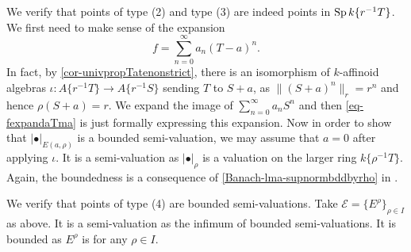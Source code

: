 \begin{example}
    We verify that points of type (2) and type (3) are indeed points in $\operatorname{Sp} k\{r^{-1}T\}$. We first need to make sense of the expansion 
    \begin{equation}\label{eq-fexpandaTma}
        f=\sum_{n=0}^{\infty}a_n (T-a)^n.
    \end{equation}
    In fact, by \cref{cor-univpropTatenonstrict}, there is an isomorphism of $k$-affinoid algebras $\iota:A\{r^{-1}T\}\rightarrow A\{r^{-1}S\}$ sending $T$ to $S+a$, as $\|(S+a)^n\|_r=r^n$ and hence $\rho(S+a)=r$. We expand the image of $\sum_{n=0}^{\infty}a_n S^n$ and then  \eqref{eq-fexpandaTma} is just formally expressing this expansion. 
    Now in order to show that $|\bullet|_{E(a,\rho)}$ is a bounded semi-valuation, we may assume that $a=0$ after applying $\iota$. 
    It is a semi-valuation as $|\bullet|_{\rho}$ is a valuation on the larger ring $k\{\rho^{-1}T\}$. Again, the boundedness is a consequence of \cref{Banach-lma-supnormbddbyrho} in . 

    We verify that points of type (4) are bounded semi-valuations. Take $\mathcal{E}=\{E^{\rho}\}_{\rho\in I}$ as above. It is a semi-valuation as the infimum of bounded semi-valuations. It is bounded as $E^{\rho}$ is for any $\rho\in I$.
\end{example}

